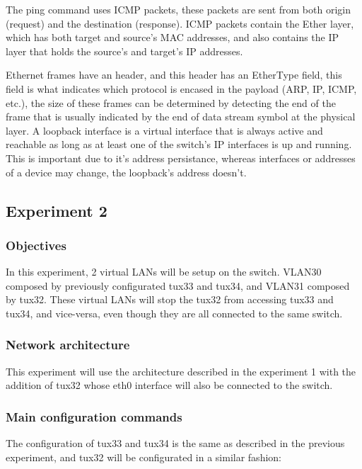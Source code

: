 \documentclass[a4paper,11pt,english]{article}
\begin{document}
            The ping command uses ICMP packets, these packets are sent from both origin (request) 
            and the destination (response). ICMP packets contain the Ether layer, which has both
            target and source's MAC addresses, and also contains the IP layer that holds the
            source's and target's IP addresses.

            Ethernet frames have an header, and this header has an EtherType field, this field
            is what indicates which protocol is encased in the payload (ARP, IP, ICMP, etc.), 
            the size of these frames can be determined by detecting the end of the frame that
            is usually indicated by the end of data stream symbol at the physical layer.
            A loopback interface is a virtual interface that is always active and reachable as 
            long as at least one of the switch's IP interfaces is up and running. This is important 
            due to it's address persistance, whereas interfaces or addresses of a device may change, 
            the loopback's address doesn't.


    \subsection{Experiment 2}
        \subsubsection{Objectives}
            In this experiment, 2 virtual LANs will be setup on the switch. 
            VLAN30 composed by previously configurated tux33 and tux34, and VLAN31 composed
            by tux32. These virtual LANs will stop the tux32 from accessing tux33 and tux34,
            and vice-versa, even though they are all connected to the same switch.
            
        \subsubsection{Network architecture}
            This experiment will use the architecture described in the experiment 1 with the
            addition of tux32 whose eth0 interface will also be connected to the switch.

        \subsubsection{Main configuration commands}
            The configuration of tux33 and tux34 is the same as described in the previous
            experiment, and tux32 will be configurated in a similar fashion:
\end{document}
